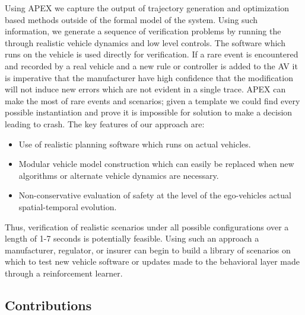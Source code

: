  Using APEX we capture the output of trajectory generation and optimization based methods outside of the formal model of the system. Using such information, we generate a sequence of verification problems by running the through realistic vehicle dynamics and low level controls. The software which runs on the vehicle is used directly for verification. If a rare event is encountered and recorded by a real vehicle and a new rule or controller is added to the AV it is imperative that the manufacturer have high confidence that the modification will not induce new errors which are not evident in a single trace. APEX can make the most of rare events and scenarios; given a template we could find every possible instantiation and prove it is impossible for solution to make a decision leading to crash. The key features of our approach are:
 \begin{itemize}
 	\item Use of realistic planning software which runs on actual vehicles.
 	\item Modular vehicle model construction which can easily be replaced when new algorithms or alternate vehicle dynamics are necessary.
 	\item Non-conservative evaluation of safety at the level of the ego-vehicles actual spatial-temporal evolution. 
 \end{itemize}
 
 Thus, verification of realistic scenarios under all possible configurations over a length of 1-7 seconds is potentially feasible. Using such an approach a manufacturer, regulator, or insurer can begin to build a library of scenarios on which to test new vehicle software or updates made to the behavioral layer made through a reinforcement learner.
 
 \subsection{Contributions}
 
